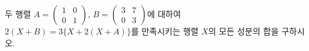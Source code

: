 두 행렬 $A=\begin{pmatrix} 1 & 0 \\ 0 & 1 \end{pmatrix}$, $B=\begin{pmatrix} 3 & 7 \\ 0 & 3 \end{pmatrix}$에 대하여 $2(X+B)=3\{X+2(X+A)\}$를 만족시키는 행렬 $X$의 모든 성분의 합을 구하시오.
